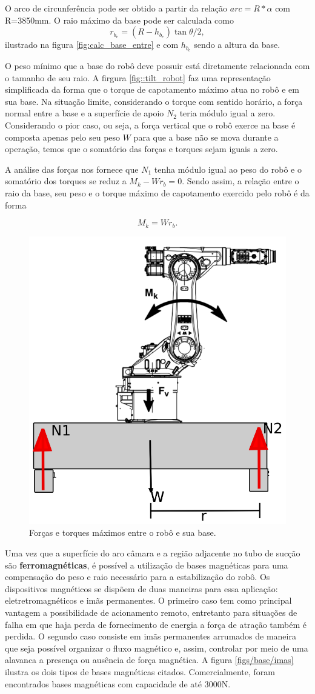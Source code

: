 O arco de circunferência pode ser obtido a partir da relação $arc=R*\alpha$ com
R=3850mm. O raio máximo da base pode ser calculada como 
$$r_{b_e} = (R - h_{b_e})\tan{\theta/2},$$  ilustrado na figura
\ref{fig:calc_base_entre} e com $h_{b_e}$ sendo a altura da base.

O peso mínimo que a base do robô deve possuir está diretamente relacionada com o
tamanho de seu raio. A firgura \ref{fig::tilt_robot} faz uma representação
simplificada da forma que o torque de capotamento máximo atua no robô e em sua
base. Na situação limite, considerando o torque com sentido horário, a força
normal entre a base e a superfície de apoio $N_2$ teria módulo igual a zero.
Considerando o pior caso, ou seja, a força vertical que o robô exerce na base é
composta apenas pelo seu peso $W$ para que a base não se mova durante a
operação, temos que o somatório das forças e torques sejam iguais a zero.

A análise das forças nos fornece que $N_1$ tenha módulo igual ao peso do robô e
o somatório dos torques se reduz a $M_k-Wr_b=0$. Sendo assim, a relação entre
o raio da base, seu peso e o torque máximo de capotamento exercido pelo robô é
da forma 

$$M_k=Wr_b.$$

\begin{figure}[h!]
\centering
	\includegraphics[width=0.5\columnwidth]{figs/base/tilt}
	\caption{Forças e torques máximos entre o robô e sua base.}
\end{figure}

Uma vez que a superfície do aro câmara e a região adjacente no tubo de sucção
são \textbf{ferromagnéticas}, é possível a utilização de bases magnéticas para
uma compensação do peso e raio necessário para a estabilização do robô. Os
dispositivos magnéticos se dispõem de duas maneiras para essa aplicação:
eletretromagnéticos e imãs permanentes. O primeiro caso tem como principal
vantagem a possibilidade de acionamento remoto, entretanto para situações de
falha em que haja perda de fornecimento de energia a força de atração também é
perdida. O segundo caso consiste em imãs permanentes arrumados de maneira que
seja possível organizar o fluxo magnético e, assim, controlar por meio de uma
alavanca a presença ou ausência de força magnética. A figura
\ref{figs/base/imas} ilustra os dois tipos de bases magnéticas citados.
Comercialmente, foram encontrados bases magnéticas com capacidade de até 3000N.












